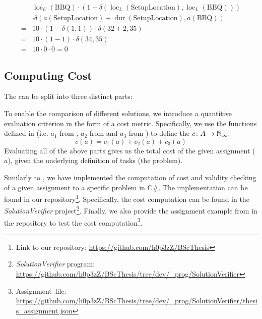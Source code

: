 \begin{itemize}
\begin{enumerate}
                        \begin{align*}
                                & \operatorname{loc}_C(\text{BBQ}) \cdot (1 - \delta(\operatorname{loc}_L(\text{SetupLocation}), \operatorname{loc}_L(\text{BBQ}))) \\
                                & \cdot \delta(a(\text{SetupLocation}) + \operatorname{dur}(\text{SetupLocation}), a(\text{BBQ}))                                   \\
                              = & 10 \cdot (1 - \delta(1, 1)) \cdot \delta(32 + 2, 35)                                                                              \\
                              = & 10 \cdot (1 - 1) \cdot \delta(34, 35)                                                                                             \\
                              = & 10 \cdot 0 \cdot 0 = 0
                        \end{align*}
            \end{enumerate}
\end{itemize}

\subsection{Computing Cost}
\label{subsec:formal-framework:semantics:computing-cost}
The  can be split into three distinct parts:

To enable the comparison of different solutions, we introduce a quantitive evaluation criterion in the form of a cost metric. Specifically, we use the functions defined in  (i.e. $a_1$ from , $a_2$ from  and $a_3$ from ) to define the  $c \colon A \to \mathbb{N}_{\infty}$:
$$c(a) = c_1(a) + c_2(a) + c_3(a)$$
Evaluating all of the above parts gives us the total cost of the given assignment ($a$), given the underlying definition of tasks (the problem).

Similarly to , we have implemented the computation of cost and validity checking of a given assignment to a specific problem in C\#. The implementation can be found in our repository\footnote{Link to our repository: \url{https://github.com/h0p3zZ/BScThesis}}. Specifically, the cost computation can be found in the \textit{SolutionVerifier} project\footnote{\textit{SolutionVerifier} program: \url{https://github.com/h0p3zZ/BScThesis/tree/dev/_prog/SolutionVerifier}}. Finally, we also provide the assignment example from  in the repository to test the cost computation\footnote{Assignment~file: \url{https://github.com/h0p3zZ/BScThesis/tree/dev/_prog/SolutionVerifier/thesis_assignment.json}}.

